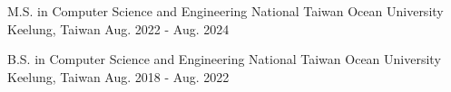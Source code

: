 

\begin{cventries}

  \cventry
    {M.S. in Computer Science and Engineering} %
    {National Taiwan Ocean University} %
    {Keelung, Taiwan} %
    {Aug. 2022 - Aug. 2024} %
    {}

  \cventry
    {B.S. in Computer Science and Engineering} %
    {National Taiwan Ocean University} %
    {Keelung, Taiwan} %
    {Aug. 2018 - Aug. 2022} %
    {}

\end{cventries}
